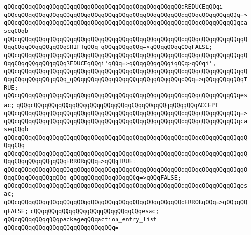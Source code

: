 \verb|qQQqqQQqqQQqqQQqqQQqqQQqqQQqqQQqqQQqqQQqqQQqqQQqqQQqREDUCEqQQqi|\newline
\verb|qQQqqQQqqQQqqQQqqQQqqQQqqQQqqQQqqQQqqQQqqQQqqQQqqQQqqQQqqQQqqQQqqQQq=>|\newline
\verb|qQQqqQQqqQQqqQQqqQQqqQQqqQQqqQQqqQQqqQQqqQQqqQQqqQQqqQQqqQQqqQQqqQQqcaseqQQqb|\newline
\verb|qQQqqQQqqQQqqQQqqQQqqQQqqQQqqQQqqQQqqQQqqQQqqQQqqQQqqQQqqQQqqQQqqQQqqQQqqQQqqQQqqQQqqQQqSHIFTqQQq_qQQqqQQqqQQq=>qQQqqQQqqQQqFALSE;|\newline
\verb|qQQqqQQqqQQqqQQqqQQqqQQqqQQqqQQqqQQqqQQqqQQqqQQqqQQqqQQqqQQqqQQqqQQqqQQqqQQqqQQqqQQqqQQqREDUCEqQQqi'qQQq=>qQQqqQQqqQQqiqQQq>qQQqi';|\newline
\verb|qQQqqQQqqQQqqQQqqQQqqQQqqQQqqQQqqQQqqQQqqQQqqQQqqQQqqQQqqQQqqQQqqQQqqQQqqQQqqQQqqQQqqQQq_qQQqqQQqqQQqqQQqqQQqqQQqqQQqqQQqqQQq=>qQQqqQQqqQQqTRUE;|\newline
\verb|qQQqqQQqqQQqqQQqqQQqqQQqqQQqqQQqqQQqqQQqqQQqqQQqqQQqqQQqqQQqqQQqqQQqesac;|\newline
\newline
\verb|qQQqqQQqqQQqqQQqqQQqqQQqqQQqqQQqqQQqqQQqqQQqqQQqqQQqACCEPT|\newline
\verb|qQQqqQQqqQQqqQQqqQQqqQQqqQQqqQQqqQQqqQQqqQQqqQQqqQQqqQQqqQQqqQQqqQQq=>|\newline
\verb|qQQqqQQqqQQqqQQqqQQqqQQqqQQqqQQqqQQqqQQqqQQqqQQqqQQqqQQqqQQqqQQqqQQqcaseqQQqb|\newline
\verb|qQQqqQQqqQQqqQQqqQQqqQQqqQQqqQQqqQQqqQQqqQQqqQQqqQQqqQQqqQQqqQQqqQQqqQQqqQQq|\newline
\verb|qQQqqQQqqQQqqQQqqQQqqQQqqQQqqQQqqQQqqQQqqQQqqQQqqQQqqQQqqQQqqQQqqQQqqQQqqQQqqQQqqQQqqQQqERRORqQQq=>qQQqTRUE;|\newline
\verb|qQQqqQQqqQQqqQQqqQQqqQQqqQQqqQQqqQQqqQQqqQQqqQQqqQQqqQQqqQQqqQQqqQQqqQQqqQQqqQQqqQQqqQQq_qQQqqQQqqQQqqQQqqQQq=>qQQqFALSE;|\newline
\verb|qQQqqQQqqQQqqQQqqQQqqQQqqQQqqQQqqQQqqQQqqQQqqQQqqQQqqQQqqQQqqQQqqQQqesac;|\newline
\newline
\verb|qQQqqQQqqQQqqQQqqQQqqQQqqQQqqQQqqQQqqQQqqQQqqQQqqQQqERRORqQQq=>qQQqqQQqFALSE;|\newline
\verb|qQQqqQQqqQQqqQQqqQQqqQQqqQQqqQQqesac;|\newline
\newline
\verb|qQQqqQQqqQQqqQQqpackageqQQqaction_entry_list|\newline
\verb|qQQqqQQqqQQqqQQqqQQqqQQqqQQqqQQq=|\newline
